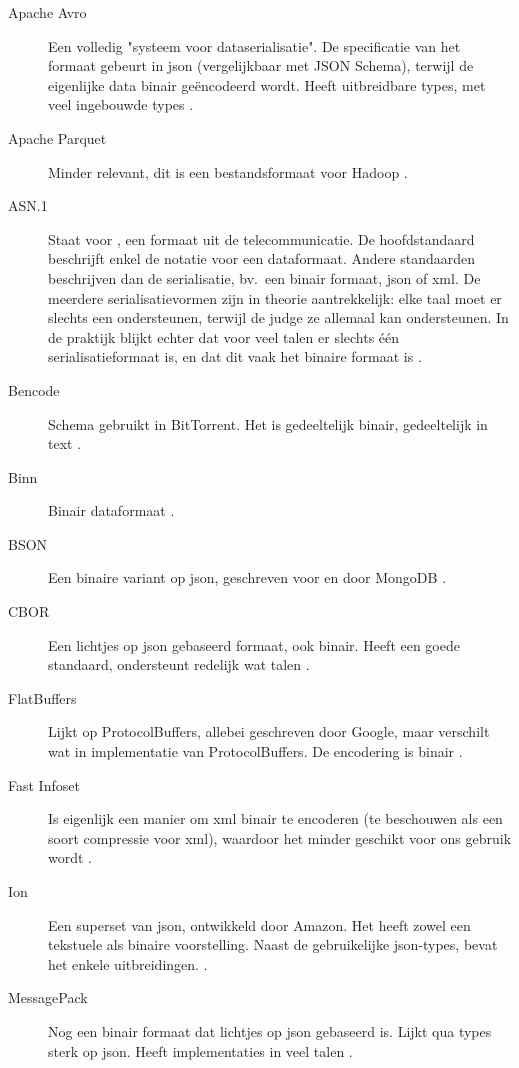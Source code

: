 \begin{description}
    \item[Apache Avro] Een volledig "systeem voor dataserialisatie".
    De specificatie van het formaat gebeurt in json (vergelijkbaar met JSON Schema), terwijl de eigenlijke data binair geëncodeerd wordt.
    Heeft uitbreidbare types, met veel ingebouwde types \autocite{avro}.
    \item[Apache Parquet] Minder relevant, dit is een bestandsformaat voor Hadoop \autocite{parquet}.
    \item[ASN.1] Staat voor , een formaat uit de telecommunicatie.
    De hoofdstandaard beschrijft enkel de notatie voor een dataformaat.
    Andere standaarden beschrijven dan de serialisatie, bv.\ een binair formaat, json of xml.
    De meerdere serialisatievormen zijn in theorie aantrekkelijk: elke taal moet er slechts een ondersteunen, terwijl de judge ze allemaal kan ondersteunen.
    In de praktijk blijkt echter dat voor veel talen er slechts één serialisatieformaat is, en dat dit vaak het binaire formaat is \autocite{x680}.
    \item[Bencode] Schema gebruikt in BitTorrent.
    Het is gedeeltelijk binair, gedeeltelijk in text \autocite{cohen2017}.
    \item[Binn] Binair dataformaat \autocite{ramos2019}.
    \item[BSON] Een binaire variant op json, geschreven voor en door MongoDB \autocite{bson}.
    \item[CBOR] Een lichtjes op json gebaseerd formaat, ook binair.
    Heeft een goede standaard, ondersteunt redelijk wat talen \autocite{rfc7049}.
    \item[FlatBuffers] Lijkt op ProtocolBuffers, allebei geschreven door Google, maar verschilt wat in implementatie van ProtocolBuffers.
    De encodering is binair \autocite{flatbuffers}.
    \item[Fast Infoset] Is eigenlijk een manier om xml binair te encoderen (te beschouwen als een soort compressie voor xml), waardoor het minder geschikt voor ons gebruik wordt \autocite{x981}.
    \item[Ion] Een superset van json, ontwikkeld door Amazon.
    Het heeft zowel een tekstuele als binaire voorstelling.
    Naast de gebruikelijke json-types, bevat het enkele uitbreidingen. \autocite{ion}.
    \item[MessagePack] Nog een binair formaat dat lichtjes op json gebaseerd is.
    Lijkt qua types sterk op json.
    Heeft implementaties in veel talen \autocite{messagepack}.

\end{description}
